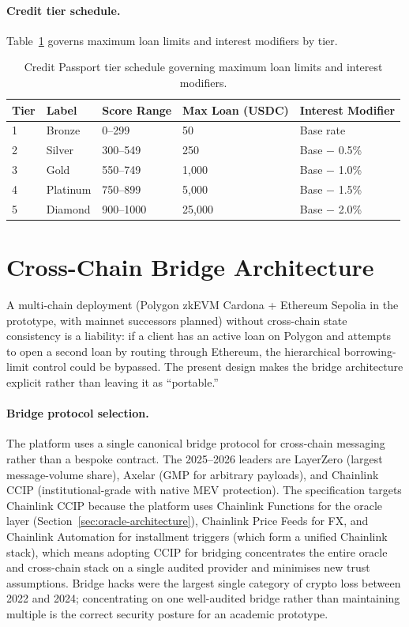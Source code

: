 \documentclass[12pt,a4paper]{report}
\newcommand{\tableheadcolor}{\rowcolor{TableHeadBg}}
\begin{document}
\paragraph{Credit tier schedule.}
Table~\ref{tab:credit-tiers} governs maximum loan limits and interest modifiers by tier.

\begin{table}[H]
\centering
\caption[Credit Passport tier schedule]{Credit Passport tier schedule governing maximum loan limits and interest modifiers.}
\label{tab:credit-tiers}
\begin{tabular}{p{0.8cm}p{2.2cm}p{2.6cm}p{3.2cm}p{3.8cm}}
\toprule
\tableheadcolor
\textbf{Tier} & \textbf{Label} & \textbf{Score Range} & \textbf{Max Loan (USDC)} & \textbf{Interest Modifier} \\
\midrule
1 & Bronze & 0--299 & 50 & Base rate \\
2 & Silver & 300--549 & 250 & Base $-$ 0.5\% \\
3 & Gold & 550--749 & 1,000 & Base $-$ 1.0\% \\
4 & Platinum & 750--899 & 5,000 & Base $-$ 1.5\% \\
5 & Diamond & 900--1000 & 25,000 & Base $-$ 2.0\% \\
\bottomrule
\end{tabular}
\end{table}

\section{Cross-Chain Bridge Architecture}
\label{sec:bridge}

A multi-chain deployment (Polygon zkEVM Cardona + Ethereum Sepolia in the prototype, with mainnet successors planned) without cross-chain state consistency is a liability: if a client has an active loan on Polygon and attempts to open a second loan by routing through Ethereum, the hierarchical borrowing-limit control could be bypassed. The present design makes the bridge architecture explicit rather than leaving it as ``portable.''

\paragraph{Bridge protocol selection.}
The platform uses a single canonical bridge protocol for cross-chain messaging rather than a bespoke contract. The 2025--2026 leaders are LayerZero (largest message-volume share), Axelar (GMP for arbitrary payloads), and Chainlink CCIP (institutional-grade with native MEV protection). The specification targets Chainlink CCIP because the platform uses Chainlink Functions for the oracle layer (Section~\ref{sec:oracle-architecture}), Chainlink Price Feeds for FX, and Chainlink Automation for installment triggers (which form a unified Chainlink stack), which means adopting CCIP for bridging concentrates the entire oracle and cross-chain stack on a single audited provider and minimises new trust assumptions. Bridge hacks were the largest single category of crypto loss between 2022 and 2024; concentrating on one well-audited bridge rather than maintaining multiple is the correct security posture for an academic prototype.
\end{document}
